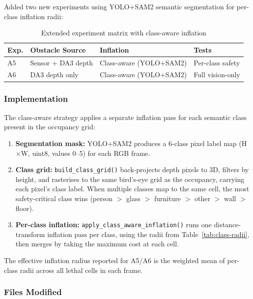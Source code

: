 \documentclass[11pt,a4paper]{article}
\begin{document}
Added two new experiments using YOLO+SAM2 semantic segmentation for
per-class inflation radii:

\begin{table}[h]
\centering
\caption{Extended experiment matrix with class-aware inflation}
\label{tab:experiments-extended}
\begin{tabular}{llll}
\toprule
\textbf{Exp.} & \textbf{Obstacle Source} & \textbf{Inflation} & \textbf{Tests} \\
\midrule
A5 & Sensor + DA3 depth & Class-aware (YOLO+SAM2) & Per-class safety \\
A6 & DA3 depth only     & Class-aware (YOLO+SAM2) & Full vision-only \\
\bottomrule
\end{tabular}
\end{table}

\subsubsection{Implementation}

The class-aware strategy applies a separate inflation pass for each
semantic class present in the occupancy grid:

\begin{enumerate}[nosep]
  \item \textbf{Segmentation mask:} YOLO+SAM2 produces a 6-class pixel
    label map (H$\times$W, uint8, values 0--5) for each RGB frame.
  \item \textbf{Class grid:} \texttt{build\_class\_grid()} back-projects
    depth pixels to 3D, filters by height, and rasterises to the same
    bird's-eye grid as the occupancy, carrying each pixel's class label.
    When multiple classes map to the same cell, the most safety-critical
    class wins (person $>$ glass $>$ furniture $>$ other $>$ wall $>$ floor).
  \item \textbf{Per-class inflation:} \texttt{apply\_class\_aware\_inflation()}
    runs one distance-transform inflation pass per class, using the radii
    from Table~\ref{tab:class-radii}, then merges by taking the maximum
    cost at each cell.
\end{enumerate}

The effective inflation radius reported for A5/A6 is the weighted mean
of per-class radii across all lethal cells in each frame.

\subsubsection{Files Modified}
\end{document}
